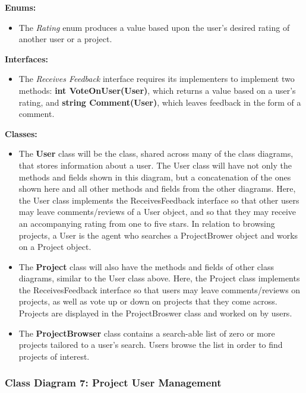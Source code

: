 \documentclass[twoside,letterpaper]{article}
\begin{document}
	
	\textbf{Enums:}\\
	\begin{itemize}
		\item The \textit{Rating} enum produces a value based upon the user's desired rating of another user or a project.
	\end{itemize}
	\textbf{Interfaces:}\\
	\begin{itemize}
		\item The \textit{Receives Feedback} interface requires its implementers to implement two methods: \textbf{int VoteOnUser(User)}, which returns a value based on a user's rating, and \textbf{string Comment(User)}, which leaves feedback in the form of a comment.
	\end{itemize}
	\textbf{Classes:}
	\begin{itemize}
		\item The \textbf{User} class will be the class, shared across many of the class diagrams, that stores information about a user. The User class will have not only the methods and fields shown in this diagram, but a concatenation of the ones shown here and all other methods and fields from the other diagrams. Here, the User class implements the ReceivesFeedback interface so that other users may leave comments/reviews of a User object, and so that they may receive an accompanying rating from one to five stars. In relation to browsing projects, a User is the agent who searches a ProjectBrower object and works on a Project object.
		\item The \textbf{Project} class will also have the methods and fields of other class diagrams, similar to the User class above. Here, the Project class implements the ReceivesFeedback interface so that users may leave comments/reviews on projects, as well as vote up or down on projects that they come across. Projects are displayed in the ProjectBroswer class and worked on by users.
		\item The \textbf{ProjectBrowser} class contains a search-able list of zero or more projects tailored to a user's search. Users browse the list in order to find projects of interest.
	\end{itemize}
	
	\newpage
	\subsubsection[Class Diagram 7: Project User Management]{\rmfamily\bfseries\color{black}
		Class Diagram 7: Project User Management}
	\hypertarget{RefHeading22059017292}{}
	\bigskip
	
\end{document}

